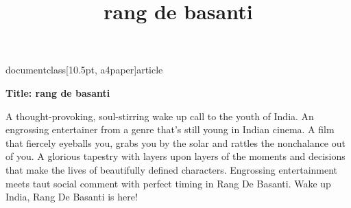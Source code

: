 
documentclass[10.5pt, a4paper]{article}
\usepackage{amsfonts}
\usepackage[top=0.3in,left=0.2in,right=0.2in]{geometry}
\usepackage{times}
\usepackage{tabularx}
\title{rang de basanti}

\maketitle
\textbf{Title: rang de basanti}

A thought-provoking, soul-stirring wake up call to the youth of India. An engrossing entertainer from a genre
 that's still young in Indian cinema. A film that fiercely eyeballs you, grabs you by the solar and rattles the
 nonchalance out of you. A glorious tapestry with layers upon layers of the moments and decisions that make the
 lives of beautifully defined characters. Engrossing entertainment meets taut social comment with perfect timing
 in Rang De Basanti. Wake up India, Rang De Basanti is here!


